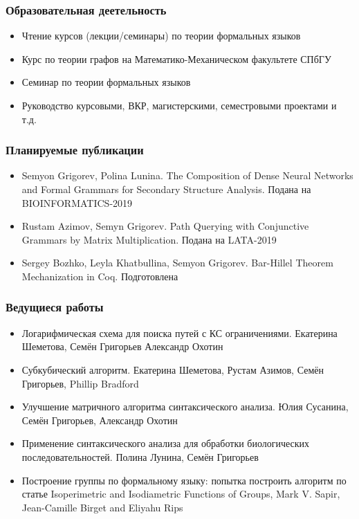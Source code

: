 \documentclass[xcolor=table]{beamer}
\begin{document}
\begin{frame}[fragile]
  \transwipe[direction=90]
  \frametitle{Образовательная деетельность}
\begin{itemize}
      \item Чтение курсов (лекции/семинары) по теории формальных языков 
      \item Курс по теории графов на Математико-Механическом факультете СПбГУ
      \item Семинар по теории формальных языков
      \item Руководство курсовыми, ВКР, магистерскими, семестровыми проектами и т.д.
\end{itemize}
\end{frame}

\begin{frame}[fragile]
  \transwipe[direction=90]
  \frametitle{Планируемые публикации}
\begin{itemize}
      \item Semyon Grigorev, Polina Lunina. The Composition of Dense Neural Networks and Formal Grammars for Secondary Structure Analysis. Подана на BIOINFORMATICS-2019
      \item Rustam Azimov, Semyn Grigorev. Path Querying with Conjunctive Grammars by Matrix Multiplication. Подана на LATA-2019
      \item Sergey Bozhko, Leyla Khatbullina, Semyon Grigorev. Bar-Hillel Theorem Mechanization in Coq. Подготовлена
\end{itemize}
\end{frame}

\begin{frame}[fragile]
  \transwipe[direction=90]
  \frametitle{Ведущиеся работы}
\begin{itemize}
      \item Логарифмическая схема для поиска путей с КС ограничениями. Екатерина Шеметова, Семён Григорьев Александр Охотин
      \item Субкубический алгоритм. Екатерина Шеметова, Рустам Азимов, Семён Григорьев, Phillip Bradford
      \item Улучшение матричного алгоритма синтаксического анализа. Юлия Сусанина, Семён Григорьев, Александр Охотин
      \item Применение синтаксического анализа для обработки биологических последовательностей. Полина Лунина, Семён Григорьев
      \item Построение группы по формальному языку: попытка построить алгоритм по статье Isoperimetric and Isodiametric Functions of Groups, Mark V. Sapir, Jean-Camille Birget and Eliyahu Rips
\end{itemize}
\end{frame}
\end{document}
